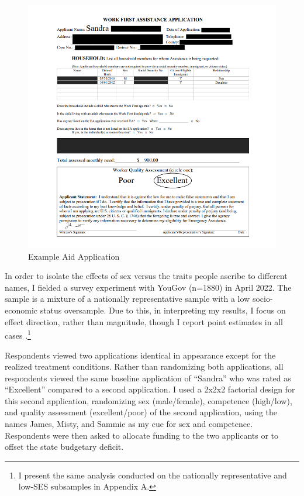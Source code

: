 \documentclass[12pt]{article}%
\begin{document}
\begin{doublespace}
\begin{figure}[h!]
	\centering
	\includegraphics[scale=1]{figs/example_treatment.png}
	\caption{Example Aid Application}
	\label{figure2}
\end{figure}


In order to isolate the effects of sex versus the traits people ascribe to different names, I fielded a survey experiment with YouGov (n=1880) in April 2022. The sample is a mixture of a nationally representative sample with a low socio-economic status oversample. Due to this, in interpreting my results, I focus on effect direction, rather than magnitude, though I report point estimates in all cases \citep{horton2011online}.\footnote{I present the same analysis conducted on the nationally representative and low-SES subsamples in Appendix A.} 

Respondents viewed two applications identical in appearance except for the realized treatment conditions. Rather than randomizing both applications, all respondents viewed the same baseline application of ``Sandra” who was rated as ``Excellent” compared to a second application. I used a 2x2x2 factorial design for this second application, randomizing sex (male/female), competence (high/low), and quality assessment (excellent/poor) of the second application, using the names James, Misty, and Sammie as my cue for sex and competence. Respondents were then asked to allocate funding to the two applicants or to offset the state budgetary deficit.


\end{doublespace}
\end{document}
